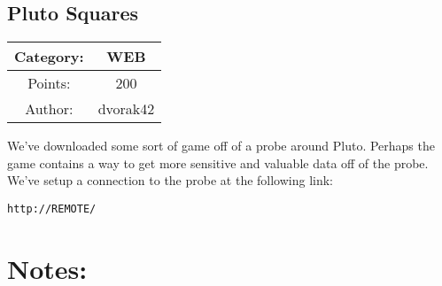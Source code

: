 \begin{center}
\section*{Pluto Squares}
{\large
\begin{tabular}{| c c |}
\hline
Category: & WEB\\\hline
Points: & 200\\\hline
Author: & dvorak42\\\hline
\end{tabular}
}
\end{center}
\vspace{0.5in}

{\large
We've downloaded some sort of game off of a probe around Pluto. Perhaps the game contains a way to get more sensitive and valuable data off of the probe. We've setup a connection to the probe at the following link:
}
\vspace{0.25in}
\begin{center}
  {\Large\tt http://REMOTE/}
\end{center}

\vspace{0.25in}
\section*{Notes:}
